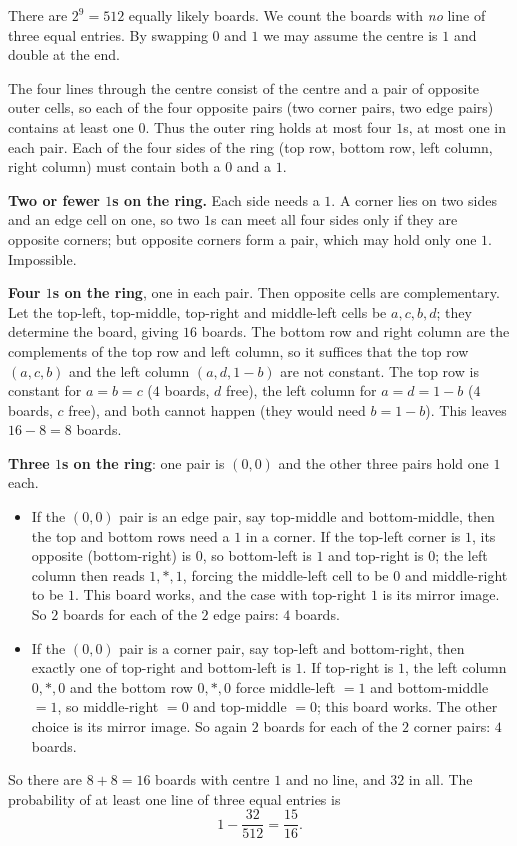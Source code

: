 There are $2^9=512$ equally likely boards. We count the boards with \emph{no} line of three equal entries. By swapping $0$ and $1$ we may assume the centre is $1$ and double at the end.

The four lines through the centre consist of the centre and a pair of opposite outer cells, so each of the four opposite pairs (two corner pairs, two edge pairs) contains at least one $0$. Thus the outer ring holds at most four $1$s, at most one in each pair. Each of the four sides of the ring (top row, bottom row, left column, right column) must contain both a $0$ and a $1$.

\textbf{Two or fewer $1$s on the ring.} Each side needs a $1$. A corner lies on two sides and an edge cell on one, so two $1$s can meet all four sides only if they are opposite corners; but opposite corners form a pair, which may hold only one $1$. Impossible.

\textbf{Four $1$s on the ring}, one in each pair. Then opposite cells are complementary. Let the top-left, top-middle, top-right and middle-left cells be $a,c,b,d$; they determine the board, giving $16$ boards. The bottom row and right column are the complements of the top row and left column, so it suffices that the top row $(a,c,b)$ and the left column $(a,d,1-b)$ are not constant. The top row is constant for $a=b=c$ ($4$ boards, $d$ free), the left column for $a=d=1-b$ ($4$ boards, $c$ free), and both cannot happen (they would need $b=1-b$). This leaves $16-8=8$ boards.

\textbf{Three $1$s on the ring}: one pair is $(0,0)$ and the other three pairs hold one $1$ each.
\begin{itemize}
\item If the $(0,0)$ pair is an edge pair, say top-middle and bottom-middle, then the top and bottom rows need a $1$ in a corner. If the top-left corner is $1$, its opposite (bottom-right) is $0$, so bottom-left is $1$ and top-right is $0$; the left column then reads $1,\ast,1$, forcing the middle-left cell to be $0$ and middle-right to be $1$. This board works, and the case with top-right $1$ is its mirror image. So $2$ boards for each of the $2$ edge pairs: $4$ boards.
\item If the $(0,0)$ pair is a corner pair, say top-left and bottom-right, then exactly one of top-right and bottom-left is $1$. If top-right is $1$, the left column $0,\ast,0$ and the bottom row $0,\ast,0$ force middle-left $=1$ and bottom-middle $=1$, so middle-right $=0$ and top-middle $=0$; this board works. The other choice is its mirror image. So again $2$ boards for each of the $2$ corner pairs: $4$ boards.
\end{itemize}

So there are $8+8=16$ boards with centre $1$ and no line, and $32$ in all. The probability of at least one line of three equal entries is
\[
1-\dfrac{32}{512}=\boxed{\dfrac{15}{16}}.
\]
